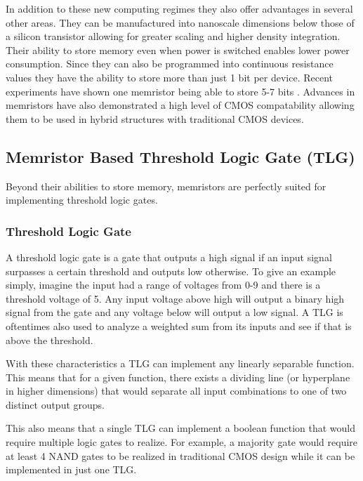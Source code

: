 \documentclass[sigconf]{acmart}
\begin{document}
In addition to these new computing regimes they also offer advantages 
in several other areas. They can be manufactured into nanoscale 
dimensions below those of a silicon transistor allowing for greater scaling 
and higher density integration. Their ability to store memory even 
when power is switched enables lower power consumption. Since they can 
also be programmed into continuous resistance values they have the 
ability to store more than just 1 bit per device. Recent experiments
have shown one memristor being able to store 5-7 bits \cite{papandroulidakis2019practical}. Advances 
in memristors have also demonstrated a high level of CMOS compatability 
allowing them to be used in hybrid structures with traditional CMOS 
devices. 

\subsection{Memristor Based Threshold Logic Gate (TLG)}
Beyond their abilities to store memory, memristors are perfectly suited 
for implementing threshold logic gates. 

\subsubsection{Threshold Logic Gate}
A threshold logic gate is a gate that outputs a high signal if 
an input signal surpasses a certain threshold and outputs low 
otherwise. To give an example simply, imagine the input had a range 
of voltages from 0-9 and there is a threshold voltage of 5. Any
input voltage above high will output a binary high signal from the 
gate and any voltage below will output a low signal. A TLG 
is oftentimes also used to analyze a weighted sum from its inputs 
and see if that is above the threshold. 

With these characteristics a TLG can implement any linearly separable
function. This means that for a given function, there exists a 
dividing line (or hyperplane in higher dimensions) that would 
separate all input combinations to one of two distinct output 
groups. 

This also means that a single TLG can implement a boolean function 
that would require multiple logic gates to realize. For example, a 
majority gate would require at least 4 NAND gates to be realized in 
traditional CMOS design while it can be implemented in just one TLG. 
\end{document}
